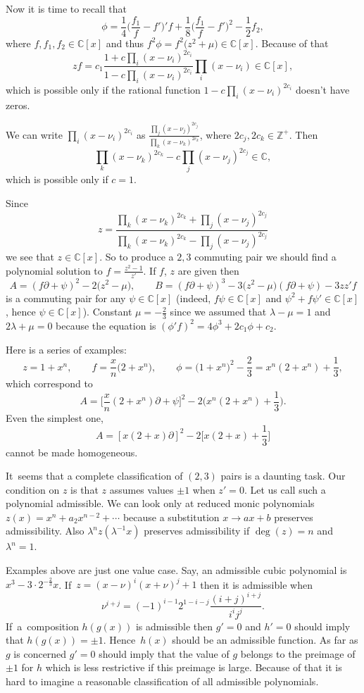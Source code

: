 \documentclass[10pt,a4paper]{amsart}
\numberwithin{equation}{section}
\newcommand{\de}{\partial}
\newcommand{\Z}{\mathbb Z}
\newcommand{\C}{\mathbb C}
\newcommand{\la}{\lambda}
\begin{document}
Now it is time to recall that
\[
\phi = \frac{1}{4}\bigg(\frac{f_1}{f} - f'\bigg)'f + \frac{1}{8}\bigg(\frac{f_1}{f} - f'\bigg)^2 - \frac{1}{2}f_2,
\]
where $f, f_1, f_2 \in \C[x]$ and thus $f^2\phi = f^2\big(z^2 + \mu\big) \in \C[x]$.
Because of that{\samepage
\[
zf = c_1\frac{1 + c \prod_i(x - \nu_i)^{2c_i}}{1 - c \prod_i(x - \nu_i)^{2c_i}}\prod_i (x - \nu_i) \in \C[x],
\]
which is possible only if the rational function $1 - c \prod_i(x - \nu_i)^{2c_i}$ doesn't have zeros.}

We can write $\prod_i(x - \nu_i)^{2c_i}$ as $\frac{\prod_j(x - \nu_j)^{2c_j}}{\prod_k(x - \nu_k)^{2c_k}}$, where $2c_j, 2c_k \in \Z^+$.
Then
\[
\prod_k(x - \nu_k)^{2c_k} - c\prod_j(x - \nu_j)^{2c_j} \in \C,
\]
which is possible only if $c = 1$.

Since
\[
z = \frac{\prod_k(x - \nu_k)^{2c_k} + \prod_j(x - \nu_j)^{2c_j}}{\prod_k(x - \nu_k)^{2c_k} - \prod_j(x - \nu_j)^{2c_j}}
\]
we see that $z \in \C[x]$. So to produce a $2,3$ commuting pair we should find a polynomial solution to $f = \frac{z^2 - 1}{z'}$.
If $f$, $z$ are given then
\[
A = (f\de + \psi)^2 - 2\big(z^2 - \mu\big), \qquad
B = (f\de + \psi)^3 - 3\big(z^2 - \mu\big)(f\de + \psi) - 3zz'f
\]
is a commuting pair for any $\psi \in \C[x]$ (indeed, $f\psi \in \C[x]$ and $\psi^2 + f\psi' \in \C[x]$, hence $\psi \in \C[x]$).
Constant $\mu = -\frac{2}{3}$ since we assumed that $\la - \mu = 1$ and $2\la + \mu = 0$ because the equation is $(\phi'f)^2 = 4\phi^3 + 2c_1\phi + c_2$.

Here is a series of examples:
\[
z = 1 + x^n,\qquad
f = \frac{x}{n}\big(2 + x^n\big),\qquad
\phi = \big(1 + x^n\big)^2 - \frac{2}{3} = x^n(2 + x^n) +\frac{1}{3},
\]
which correspond to
\[
A = \bigg[\frac{x}{n}(2 + x^n)\de + \psi\bigg]^2 - 2\bigg(x^n(2 + x^n) + \frac{1}{3}\bigg).
\]
Even the simplest one,
\[
A = [x(2 + x)\de]^2 - 2\bigg[x(2 + x) + \frac{1}{3}\bigg]
\]
cannot be made homogeneous.

It~seems that a complete classification of $(2,3)$ pairs is a daunting task. Our condition on $z$ is that $z$ assumes values $\pm 1$ when $z' = 0$. Let us call such a polynomial admissible. We can look only at reduced monic polynomials $z(x) = x^n + a_2x^{n-2} + \cdots$ because a substitution $x \rightarrow ax + b$ preserves admissibility. Also $\la^nz(\la^{-1}x)$ preserves admissibility if $\deg(z) = n$ and $\la^n = 1$.

Examples above are just one value case. Say, an admissible cubic polynomial is $x^3 - 3\cdot2^{-\frac{2}{3}}x$. If~$z = (x-\nu)^i(x+\nu)^j +1$ then it is admissible when
\[
\nu^{i+j} = (-1)^{i-1}2^{1 -i-j}\frac{(i+j)^{i+j}}{i^ij^j}.
\]
If~a~com\-position $h(g(x))$ is admissible then $g' = 0$ and $h' = 0$ should imply that $h(g(x)) = \pm1$. Hence~$h(x)$ should be an admissible function. As far as $g$ is concerned $g' = 0$ should imply that the value of $g$ belongs to the preimage of $\pm 1$ for $h$ which is less restrictive if this preimage is large.
Because of that it is hard to imagine a reasonable classification of all admissible polynomials.
\end{document}
